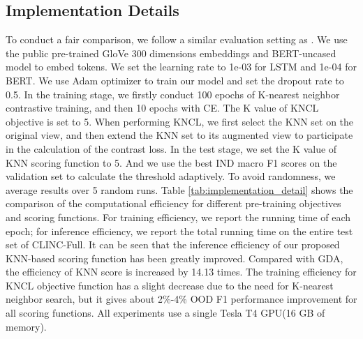 \documentclass[11pt]{article}
\begin{document}
\subsection{Implementation Details}
To conduct a fair comparison, we follow a similar evaluation setting as \citet{zeng-etal-2021-modeling}. We use the public pre-trained GloVe 300 dimensions embeddings\cite{pennington2014glove} and BERT-uncased model to embed tokens. We set the learning rate to 1e-03 for LSTM and 1e-04 for BERT\cite{Devlin2019BERTPO}. We use Adam optimizer\cite{kingma2014adam} to train our model and set the dropout rate to 0.5. In the training stage, we firstly conduct 100 epochs of K-nearest neighbor contrastive training, and then 10 epochs with CE. The K value of KNCL objective is set to 5. When performing KNCL, we first select the KNN set on the original view, and then extend the KNN set to its augmented view to participate in the calculation of the contrast loss.
In the test stage, we set the K value of KNN scoring function to 5. And we use the best IND macro F1 scores on the validation set to calculate the threshold adaptively. To avoid randomness, we average results over 5 random runs.
Table \ref{tab:implementation_detail} shows the comparison of the computational efficiency for different pre-training objectives and scoring functions. For training efficiency, we report the running time of each epoch; for inference efficiency, we report the total running time on the entire test set of CLINC-Full.
It can be seen that the inference efficiency of our proposed KNN-based scoring function has been greatly improved. Compared with GDA, the efficiency of KNN score is increased by 14.13 times. The training efficiency for KNCL objective function has a slight decrease due to the need for K-nearest neighbor search, but it gives about 2\%-4\% OOD F1 performance improvement for all scoring functions.
All experiments use a single Tesla T4 GPU(16 GB of memory). 
\end{document}

